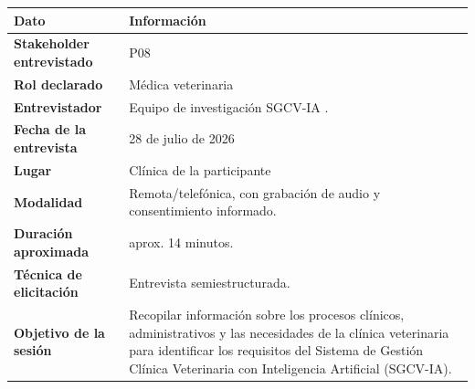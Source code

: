 \documentclass[
]{article}
\newcounter{none} %
\begin{document}
{\def\LTcaptype{none} %
\begin{longtable}[]{|
  >{\raggedright\arraybackslash}p{}|
  >{\raggedright\arraybackslash}p{}|}
\hline
\begin{minipage}[b]{\linewidth}\centering
\textbf{Dato}
\end{minipage} & \begin{minipage}[b]{\linewidth}\centering
\textbf{Información}
\end{minipage} \\
\hline
\endhead
\hline
\endlastfoot
\textbf{Stakeholder entrevistado} & \begin{minipage}[t]{\linewidth}\raggedright
P08
\end{minipage} \\
\hline
\textbf{Rol declarado} & \begin{minipage}[t]{\linewidth}\raggedright
Médica veterinaria
\end{minipage} \\
\hline
\textbf{Entrevistador} & \begin{minipage}[t]{\linewidth}\raggedright
Equipo de investigación SGCV-IA .
\end{minipage} \\
\hline
\textbf{Fecha de la entrevista} & \begin{minipage}[t]{\linewidth}\raggedright
28 de julio de 2026
\end{minipage} \\
\hline
\textbf{Lugar} & \begin{minipage}[t]{\linewidth}\raggedright
Clínica de la participante
\end{minipage} \\
\hline
\textbf{Modalidad} & \begin{minipage}[t]{\linewidth}\raggedright
Remota/telefónica, con grabación de audio y consentimiento informado.
\end{minipage} \\
\hline
\textbf{Duración aproximada} & \begin{minipage}[t]{\linewidth}\raggedright
aprox. 14 minutos.
\end{minipage} \\
\hline
\textbf{Técnica de elicitación} & \begin{minipage}[t]{\linewidth}\raggedright
Entrevista semiestructurada.
\end{minipage} \\
\hline
\textbf{Objetivo de la sesión} & \begin{minipage}[t]{\linewidth}\raggedright
Recopilar información sobre los procesos clínicos, administrativos y las necesidades de la clínica veterinaria para identificar los requisitos del Sistema de Gestión Clínica Veterinaria con Inteligencia Artificial (SGCV-IA).
\end{minipage} \\
\hline
\end{longtable}
}
\end{document}
